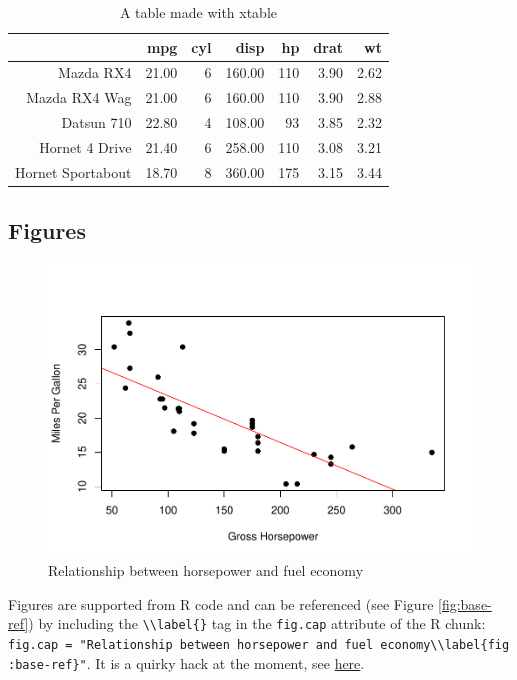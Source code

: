 \documentclass[
11pt,
a4paper]{article}
\begin{document}
\begin{table}[ht]
\centering
\caption{A table made with xtable} 
\label{tab:xtable_tab}
\begin{tabular}{rrrrrrr}
  \toprule
 & mpg & cyl & disp & hp & drat & wt \\ 
  \midrule
Mazda RX4 & 21.00 &   6 & 160.00 & 110 & 3.90 & 2.62 \\ 
  Mazda RX4 Wag & 21.00 &   6 & 160.00 & 110 & 3.90 & 2.88 \\ 
  Datsun 710 & 22.80 &   4 & 108.00 &  93 & 3.85 & 2.32 \\ 
  Hornet 4 Drive & 21.40 &   6 & 258.00 & 110 & 3.08 & 3.21 \\ 
  Hornet Sportabout & 18.70 &   8 & 360.00 & 175 & 3.15 & 3.44 \\ 
   \bottomrule
\end{tabular}
\end{table}

\hypertarget{figures}{%
\subsection{Figures}\label{figures}}

\begin{figure}
\includegraphics[width=1\linewidth]{figs/unnamed-chunk-4-1} \caption{Relationship between horsepower and fuel economy\label{fig:base-ref}}\label{fig:unnamed-chunk-4}
\end{figure}

Figures are supported from R code and can be referenced (see Figure
\ref{fig:base-ref}) by including the
\texttt{\textbackslash{}\textbackslash{}label\{\}} tag in the
\texttt{fig.cap} attribute of the R chunk:
\texttt{fig.cap\ =\ "Relationship\ between\ horsepower\ and\ fuel\ economy\textbackslash{}\textbackslash{}label\{fig:base-ref\}"}.
It is a quirky hack at the moment, see
\href{https://github.com/yihui/knitr/issues/323}{here}.
\end{document}
